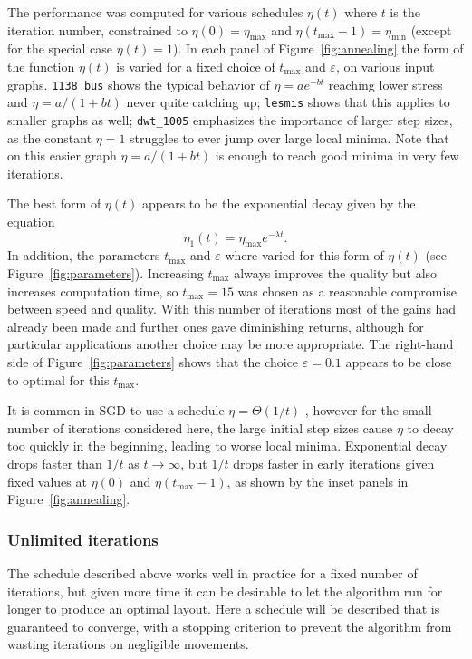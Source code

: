 The performance was computed for various schedules $\eta(t)$ where $t$ is the iteration number, constrained to $\eta(0)=\eta_{\max}$ and $\eta(t_\mathrm{max}-1)=\eta_{\min}$ (except for the special case $\eta(t)=1$).
In each panel of Figure~\ref{fig:annealing} the form of the function $\eta(t)$ is varied for a fixed choice of $t_\mathrm{max}$ and $\varepsilon$, on various input graphs.
\texttt{1138\_bus} shows the typical behavior of $\eta= ae^{-bt}$ reaching lower stress and $\eta= a/(1+bt)$ never quite catching up; \texttt{lesmis} shows that this applies to smaller graphs as well; \texttt{dwt\_1005} emphasizes the importance of larger step sizes, as the constant $\eta=1$ struggles to ever jump over large local minima. Note that on this easier graph $\eta=a/(1+bt)$ is enough to reach good minima in very few iterations.

The best form of $\eta(t)$ appears to be the exponential decay given by the equation
\begin{equation}
  \eta_1(t) = \eta_{\max} e^{-\lambda t}.
  \label{eq:expodecay}
\end{equation}
In addition, the parameters $t_\mathrm{max}$ and $\varepsilon$ where varied for this form of $\eta(t)$ (see Figure~\ref{fig:parameters}).
Increasing $t_\mathrm{max}$ always improves the quality but also increases computation time, so $t_\mathrm{max}=15$ was chosen as a reasonable compromise between speed and quality.
With this number of iterations most of the gains had already been made and further ones gave diminishing returns, although for particular applications another choice may be more appropriate.
The right-hand side of Figure~\ref{fig:parameters} shows that the choice $\varepsilon=0.1$ appears to be close to optimal for this $t_{\max}$.

It is common in SGD to use a schedule
$\eta = \Theta(1/t)$ \cite{Darken1992},
however for the small number of iterations considered here, the large initial step sizes cause $\eta$ to decay too quickly in the beginning, leading to worse local minima. 
Exponential decay drops faster than $1/t$ as $t\rightarrow\infty$, but $1/t$ drops faster in early iterations given fixed values at $\eta(0)$ and $\eta(t_{\max}-1)$, as shown by the inset panels in Figure~\ref{fig:annealing}.

\subsubsection{Unlimited iterations}
The schedule described above works well in practice for a fixed number of iterations, but given more time it can be desirable to let the algorithm run for longer to produce an optimal layout.
Here a schedule will be described that is guaranteed to converge, with a stopping criterion to prevent the algorithm from wasting iterations on negligible movements.

